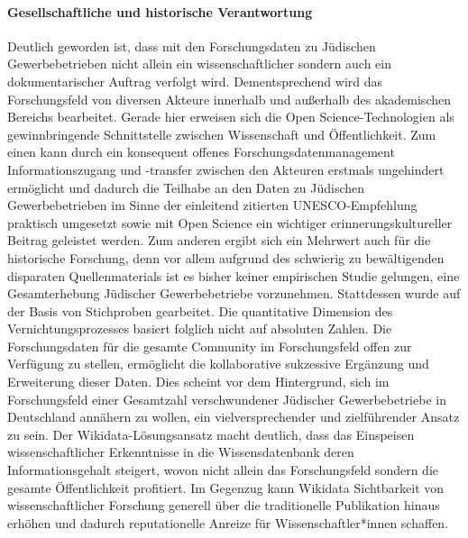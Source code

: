 \paragraph{Gesellschaftliche und historische Verantwortung} Deutlich geworden ist, dass mit den Forschungsdaten zu Jüdischen Gewerbebetrieben nicht allein ein wissenschaftlicher sondern auch ein dokumentarischer Auftrag verfolgt wird. Dementsprechend wird das Forschungsfeld von diversen Akteure innerhalb und außerhalb des akademischen Bereichs bearbeitet. Gerade hier erweisen sich die Open Science-Technologien als gewinnbringende Schnittstelle zwischen Wissenschaft und Öffentlichkeit. Zum einen kann durch ein konsequent offenes Forschungsdatenmanagement Informationszugang und -transfer zwischen den Akteuren erstmals ungehindert ermöglicht und dadurch die Teilhabe an den Daten zu Jüdischen Gewerbebetrieben im Sinne der einleitend zitierten UNESCO-Empfehlung praktisch umgesetzt sowie mit Open Science ein wichtiger erinnerungskultureller Beitrag geleistet werden. Zum anderen ergibt sich ein Mehrwert auch für die historische Forschung, denn vor allem aufgrund des schwierig zu bewältigenden disparaten Quellenmaterials ist es bisher keiner empirischen Studie gelungen, eine Gesamterhebung Jüdischer Gewerbebetriebe vorzunehmen. Stattdessen wurde auf der Basis von Stichproben gearbeitet. Die quantitative Dimension des Vernichtungsprozesses basiert folglich nicht auf absoluten Zahlen. Die Forschungsdaten für die gesamte Community im Forschungsfeld offen zur Verfügung zu stellen, ermöglicht die kollaborative sukzessive Ergänzung und Erweiterung dieser Daten. Dies scheint vor dem Hintergrund, sich im Forschungsfeld einer Gesamtzahl verschwundener Jüdischer Gewerbebetriebe in Deutschland annähern zu wollen, ein vielversprechender und zielführender Ansatz zu sein. Der Wikidata-Lösungsansatz macht deutlich, dass das Einspeisen wissenschaftlicher Erkenntnisse in die Wissensdatenbank deren Informationsgehalt steigert, wovon nicht allein das Forschungsfeld sondern die gesamte Öffentlichkeit profitiert. Im Gegenzug kann Wikidata Sichtbarkeit von wissenschaftlicher Forschung generell über die traditionelle Publikation hinaus erhöhen und dadurch reputationelle Anreize für Wissenschaftler*innen schaffen.


